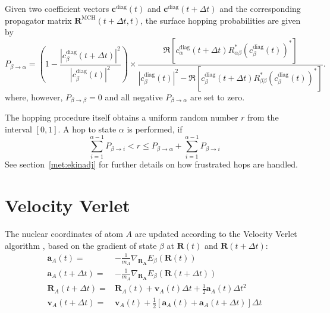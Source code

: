 \documentclass[a4paper,11pt,DIV=15,openany,twoside=false]{scrbook}
\newcommand{\VEC}[1]{\ensuremath{\mathbf{#1}}}
\begin{document}
Given two coefficient vectors $\VEC{c}^{\text{diag}}(t)$ and $\VEC{c}^{\text{diag}}(t+\Delta t)$ and the corresponding propagator matrix $\VEC{R}^{\text{MCH}}(t+\Delta t,t)$, the surface hopping probabilities are given by
\begin{equation}
  P_{\beta\rightarrow\alpha}=
  \left(
    1-
    \frac{
      \left|
        c_\beta^{\text{diag}}(t+\Delta t)
      \right|^2
    }{
      \left|
        c_\beta^{\text{diag}}(t)
      \right|^2
    }\right)
    \times
    \frac{
      \Re\left[
        c^{\text{diag}}_\alpha(t+\Delta t)
        R^*_{\alpha\beta}
        \left(
          c^{\text{diag}}_\beta(t)
        \right)^*
      \right]
    }{
      \left|
        c^{\text{diag}}_\beta(t)
      \right|^2
      -\Re\left[
        c^{\text{diag}}_\beta(t+\Delta t)
        R^*_{\beta\beta}
        \left(
          c^{\text{diag}}_\beta(t)
        \right)^*
      \right]
    }.
\end{equation}
where, however, $P_{\beta\rightarrow\beta}=0$ and all negative $P_{\beta\rightarrow\alpha}$ are set to zero.

The hopping procedure itself obtains a uniform random number $r$ from the interval $[0,1]$. A hop to state $\alpha$ is performed, if
\begin{equation}
  \sum\limits_{i=1}^{\alpha-1} P_{\beta\rightarrow i} < r \le P_{\beta\rightarrow\alpha}+\sum\limits_{i=1}^{\alpha-1} P_{\beta\rightarrow i}
\end{equation}
See section~\ref{met:ekinadj} for further details on how frustrated hops are handled.


\section{Velocity Verlet}

The nuclear coordinates of atom $A$ are updated according to the Velocity Verlet algorithm \cite{Verlet1967PR}, based on the gradient of state $\beta$ at $\VEC{R}(t)$ and $\VEC{R}(t+\Delta t)$:
\begin{align}
  \VEC{a}_A(t)=&
  -\frac{1}{m_A}\nabla_{\VEC{R_A}}E_\beta(\VEC{R}(t))\\
  \VEC{a}_A(t+\Delta t)=&
  -\frac{1}{m_A}\nabla_{\VEC{R_A}}E_\beta(\VEC{R}(t+\Delta t))\\
  \VEC{R}_A(t+\Delta t)=&
  \VEC{R}_A(t)+\VEC{v}_A(t)\Delta t + \frac{1}{2}\VEC{a}_A(t)\Delta t^2\\
  \VEC{v}_A(t+\Delta t)=&
  \VEC{v}_A(t)+\frac{1}{2}\left[\VEC{a}_A(t)+\VEC{a}_A(t+\Delta t)\right]\Delta t
\end{align}
\end{document}
